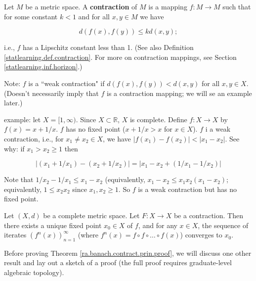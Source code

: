 \begin{definition}\label{ra.def.contraction}

Let \(M\) be a metric space. A \textbf{contraction} of \(M\) is a mapping \(f: M \to M\) such that for some constant \(k < 1\) and for all \(x, y \in M\) we have

\[
d(f(x), f(y)) \leq k d(x, y);
\]

i.e., \(f\) has a Lipschitz constant less than 1. (See also Definition \ref{statlearning.def.contraction}. For more on contraction mappings, see Section \ref{statlearning.inf.horizon}.)

Note: \(f\) is a ``weak contraction" if \(d(f(x), f(y)) < d(x, y)\) for all \(x, y \in X\). (Doesn't necessarily imply that \(f\) is a contraction mapping; we will se an example later.)

example: let \(X = [1, \infty)\). Since \(X \subset \mathbb{R}\), \(X\) is complete. Define \(f: X \to X\) by \(f(x) = x + 1/x\). \(f\) has no fixed point (\(x + 1/x > x \) for \(x \in X\)). \(f\) i a weak contraction, i.e., for \(x_1 \neq x_2 \in X\), we have \(|f(x_1) - f(x_2)| < |x_1 - x_2|\). See why: if \(x_1 > x_2 \geq 1\) then

\[
|(x_1 + 1/x_1) - (x_2 + 1/x_2)| = |x_1 - x_2 + (1/x_1 - 1/x_2)| 
\]

Note that \(1/x_2 - 1/x_1 \leq x_1 - x_2\) (equivalently, \(x_1 - x_2 \leq x_1 x_2(x_1 - x_2)\); equivalently, \(1 \leq x_2 x_2\) since \(x_1, x_2 \geq 1\). So \(f\) is a weak contraction but has no fixed point.

\end{definition}

\begin{theorem}\label{ra.banach.contract.prin.proof}

Let \((X, d)\) be a complete metric space. Let \(F: X \to X\) be a contraction. Then there exists a unique fixed point \(x_0 \in X\) of \(f\), and for any \(x \in X\), the sequence of iterates \((f^n(x))_{n=1}^\infty\) (where \(f^n(x) = f \circ f \circ \ldots \circ f(x)\)) converges to \(x_0\).

\end{theorem}

Before proving Theorem \ref{ra.banach.contract.prin.proof}, we will discuss one other result and lay out a sketch of a proof (the full proof requires graduate-level algebraic topology). 

